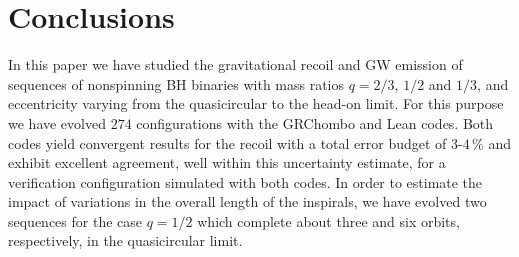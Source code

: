 \documentclass[floats,floatfix,showpacs,amssymb,physrev,twocolumn,superscriptaddress,reprint,
nofootinbib, longbibliography]{revtex4-2}
\begin{document}
\section{Conclusions}
\label{sec:concl}
%
In this paper we have studied the gravitational recoil and GW emission
of sequences of nonspinning BH binaries with mass ratios $q=2/3$,
$1/2$ and $1/3$,
and eccentricity varying from the quasicircular to the head-on limit.
For this purpose we have evolved $274$ configurations
with the {\sc GRChombo} and {\sc Lean} codes. Both codes yield
convergent results for the recoil with a total error budget of
$3$-$4\,\%$ and exhibit excellent agreement, well within this uncertainty
estimate, for a verification configuration simulated with both codes.
In order to estimate the impact of variations in the overall length
of the inspirals, we have evolved two sequences for the case $q=1/2$ which
complete about three and six orbits, respectively, in the quasicircular limit.
\end{document}

